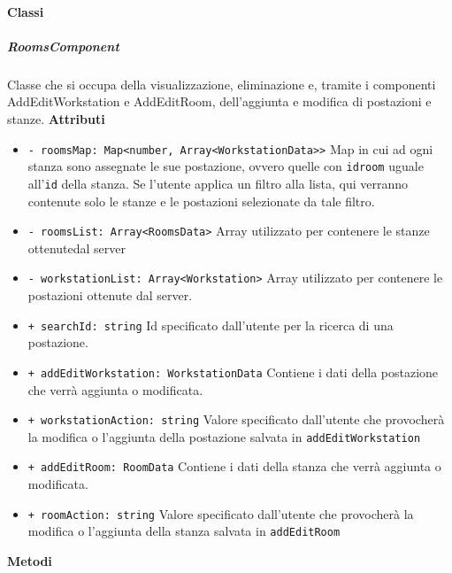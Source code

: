 \paragraph{Classi}
\subparagraph{RoomsComponent}
Classe che si occupa della visualizzazione, eliminazione e, tramite i componenti AddEditWorkstation e AddEditRoom, dell'aggiunta e modifica di postazioni e stanze. \newline
\textbf{Attributi}
\begin{itemize}
	\item \texttt{- roomsMap: Map<number, Array<WorkstationData>>} \newline
		Map in cui ad ogni stanza sono assegnate le sue postazione, ovvero quelle con \texttt{idroom} uguale all'\texttt{id} della stanza. Se l'utente applica un filtro alla lista, qui verranno contenute solo le stanze e le postazioni selezionate da tale filtro.
	\item \texttt{- roomsList: Array<RoomsData>} \newline
		Array utilizzato per contenere le stanze ottenutedal server
	\item \texttt{- workstationList: Array<Workstation>} \newline
		Array utilizzato per contenere le postazioni ottenute dal server.
	\item \texttt{+ searchId: string} \newline
		Id specificato dall'utente per la ricerca di una postazione.
	\item \texttt{+ addEditWorkstation: WorkstationData} \newline
		Contiene i dati della postazione che verrà aggiunta o modificata.
	\item \texttt{+ workstationAction: string} \newline
		Valore specificato dall'utente che provocherà la modifica o l'aggiunta della postazione salvata in \texttt{addEditWorkstation}
	\item \texttt{+ addEditRoom: RoomData} \newline
		Contiene i dati della stanza che verrà aggiunta o modificata.
	\item \texttt{+ roomAction: string} \newline
		Valore specificato dall'utente che provocherà la modifica o l'aggiunta della stanza salvata in \texttt{addEditRoom}
\end{itemize}
\textbf{Metodi}
